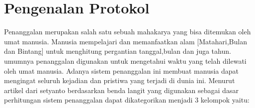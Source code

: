 

\section{Pengenalan Protokol} 
  Penanggalan merupakan salah satu sebuah mahakarya yang bisa ditemukan oleh umat manusia. Manusia mempelajari dan memanfaatkan alam [Matahari,Bulan dan Bintang] untuk menghitung pergantian tanggal,bulan dan juga tahun. 
umumnya penanggalan digunakan untuk mengetahui waktu yang telah dilewati oleh umat manusia. Adanya sistem penanggalan ini membuat manusia dapat mengingat seluruh kejadian dan pristiwa yang terjadi di dunia ini. 
Menurut artikel dari setyanto berdasarkan benda langit yang digunakan sebagai dasar perhitungan sistem penanggalan dapat dikategorikan menjadi 3 kelompok yaitu:\cite{setyanto2015kriteria} 

  \subsection{} 
   
    
  \subsection{} 
    
